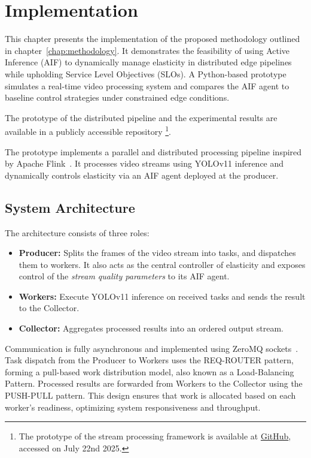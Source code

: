 \chapter{Implementation}
\label{chap:implementation}
This chapter presents the implementation of the proposed methodology outlined
in chapter~\ref{chap:methodology}. It demonstrates the feasibility of using Active Inference (AIF) to dynamically manage elasticity in distributed edge pipelines while upholding Service Level Objectives (SLOs). A Python-based prototype simulates a real-time video processing system and compares the AIF agent to baseline control strategies under constrained edge conditions.

The prototype of the distributed pipeline and the experimental results are available in a publicly accessible repository \footnote{The prototype of the stream processing framework is available at \href{https://github.com/JohnnyElaine/bsc_aif_parallel_pipeline}{GitHub}, accessed on July 22nd 2025.}.

The prototype implements a parallel and distributed processing pipeline inspired by Apache Flink~\cite{carbone_apache_2015}. It processes video streams using YOLOv11 inference and dynamically controls elasticity via an AIF agent deployed at the producer.

\section{System Architecture}
The architecture consists of three roles:
\begin{itemize}
    \item \textbf{Producer:} Splits the frames of the video stream into tasks, and dispatches them to workers. It also acts as the central controller of elasticity and exposes control of the \textit{stream quality parameters} to its AIF agent.
    \item \textbf{Workers:} Execute YOLOv11 inference on received tasks and sends the result to the Collector.
    \item \textbf{Collector:} Aggregates processed results into an ordered output stream.
\end{itemize}

Communication is fully asynchronous and implemented using ZeroMQ sockets~\cite{noauthor_zeromqpyzmq_nodate}. Task dispatch from the Producer to Workers uses the REQ-ROUTER pattern, forming a pull-based work distribution model, also known as a Load-Balancing Pattern. Processed results are forwarded from Workers to the Collector using the PUSH-PULL pattern. This design ensures that work is allocated based on each worker’s readiness, optimizing system responsiveness and throughput.

